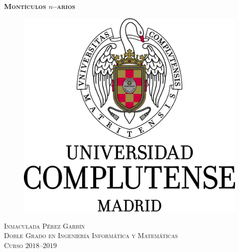 \documentclass[a4paper, 12pt, twoside, titlepage, openright, onecolumn, final]{book}
\begin{document}
	\begin{titlepage}
		\begin{center}
			\textsc{\Huge \textbf{Montículos \hbox{\boldmath $n$\unboldmath}--arios}}\\[4em]

			\begin{figure}[h]
				\begin{center}
					\includegraphics[scale=0.65]{img/ucm}
				\end{center}
			\end{figure}
			\vspace{4em}
			
			\textsc{\large Inmaculada Pérez Garbín}\\[1em]
			
			\textsc{\large Doble Grado en Ingeniería Informática y Matemáticas}\\[1em]
			
			\textsc{\large Curso $2018$--$2019$}
			
		\end{center}
		
		\vspace*{\fill}
		
	\end{titlepage}
	\frontmatter
	\tableofcontents
	
	
	\mainmatter
	
	
	
	\backmatter
	
	\cleardoublepage
	
\end{document}
